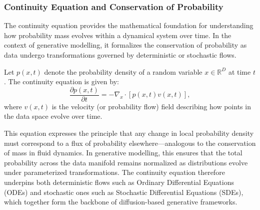 \subsubsection{Continuity Equation and Conservation of Probability}

The continuity equation provides the mathematical foundation for understanding how probability mass evolves within a dynamical system over time. In the context of generative modelling, it formalizes the conservation of probability as data undergo transformations governed by deterministic or stochastic flows.  

Let \( p(x, t) \) denote the probability density of a random variable \( x \in \mathbb{R}^D \) at time \( t \). The continuity equation is given by:
\begin{equation}
    \frac{\partial p(x, t)}{\partial t} = -\nabla_x \cdot [p(x, t) v(x, t)],
\end{equation}
where \( v(x, t) \) is the velocity (or probability flow) field describing how points in the data space evolve over time.  

This equation expresses the principle that any change in local probability density must correspond to a flux of probability elsewhere—analogous to the conservation of mass in fluid dynamics. In generative modelling, this ensures that the total probability across the data manifold remains normalized as distributions evolve under parameterized transformations. The continuity equation therefore underpins both deterministic flows such as Ordinary Differential Equations (ODEs) and stochastic ones such as Stochastic Differential Equations (SDEs), which together form the backbone of diffusion-based generative frameworks.
